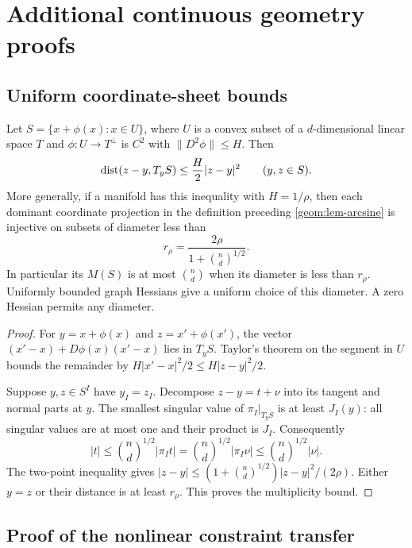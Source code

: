 \section{Additional continuous geometry proofs}
\label{app:geometry}

\subsection{Uniform coordinate-sheet bounds}

\begin{lemma}
\label{app:geometry:lem-graphs}
Let $S=\{x+\phi(x):x\in U\}$, where $U$ is a convex subset of a
$d$-dimensional linear space $T$ and $\phi:U\to T^\perp$ is $C^2$ with
$\|D^2\phi\|\leq H$. Then
\begin{equation}\label{app:geometry:eq-two-point}
 \operatorname{dist}(z-y,T_yS)\leq\frac H2|z-y|^2\qquad(y,z\in S).
\end{equation}
More generally, if a manifold has this inequality with $H=1/\rho$, then
each dominant coordinate projection in the definition preceding
\cref{geom:lem-arcsine} is injective on subsets of diameter less than
\[
 r_\rho=\frac{2\rho}{1+\binom nd^{1/2}}.
\]
In particular its $M(S)$ is at most $\binom nd$ when its diameter is
less than $r_\rho$. Uniformly bounded graph Hessians give a uniform
choice of this diameter. A zero Hessian permits any diameter.
\end{lemma}
\begin{proof}
For $y=x+\phi(x)$ and $z=x'+\phi(x')$, the vector
$(x'-x)+D\phi(x)(x'-x)$ lies in $T_yS$. Taylor's theorem on the segment
in $U$ bounds the remainder by $H|x'-x|^2/2\leq H|z-y|^2/2$.

Suppose $y,z\in S^I$ have $y_I=z_I$. Decompose $z-y=t+\nu$ into its
tangent and normal parts at $y$. The smallest singular value of
$\pi_I|_{T_yS}$ is at least $J_I(y)$: all singular values are at most
one and their product is $J_I$. Consequently
\[
 |t|\leq\binom nd^{1/2}|\pi_I t|
       =\binom nd^{1/2}|\pi_I\nu|
       \leq\binom nd^{1/2}|\nu|.
\]
The two-point inequality gives
$|z-y|\leq(1+\binom nd^{1/2})|z-y|^2/(2\rho)$.
Either $y=z$ or their distance is at least $r_\rho$. This proves the
multiplicity bound.
\end{proof}

\subsection{Proof of the nonlinear constraint transfer}
\label{app:geometry:proof-tube-kkt}

